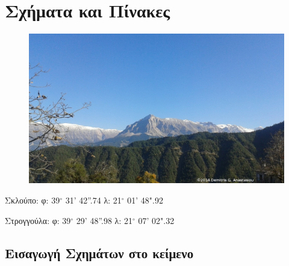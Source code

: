 \chapter{Σχήματα και Πίνακες}

\ifpdf
    \graphicspath{{Chapter3/Figs/Raster/}{Chapter3/Figs/PDF/}{Chapter3/Figs/}}
\else
    \graphicspath{{Chapter3/Figs/Vector/}{Chapter3/Figs/}}
\fi
\begin{figure}[htbp!] 
\centering    
\includegraphics[width=\textwidth]{back-skloupo1.jpg}
\label{fig:minion}
\end{figure} 

Σκλούπο: φ: 39$^\circ$ 31' 42''.74 λ: 21$^\circ$ 01' 48".92

Στρογγούλα: φ: 39$^\circ$ 29' 48''.98 λ: 21$^\circ$ 07' 02".32


\clearpage
\section{Εισαγωγή Σχημάτων στο κείμενο}


